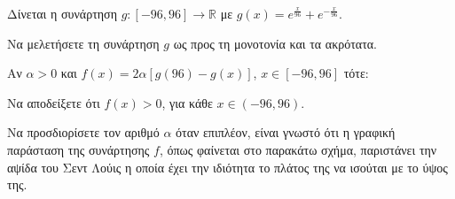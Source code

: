 Δίνεται η συνάρτηση $g:[-96,96]\to\mathbb{R}$ με $g(x)=e^{\frac{x}{96}}+e^{-\frac{x}{96}}$.
\begin{alist}
\item Να μελετήσετε τη συνάρτηση $g$ ως προς τη μονοτονία και τα ακρότατα. 
\item Αν $\alpha > 0$ και $f(x)=2\alpha\left[g(96)-g(x)\right]$, $x\in[-96,96]$ τότε:
    \begin{rlist}
    \item Να αποδείξετε ότι $f(x)>0$, για κάθε $x\in(-96,96)$. 
    \item Να προσδιορίσετε τον αριθμό $\alpha$ όταν επιπλέον, είναι γνωστό ότι η γραφική παράσταση της συνάρτησης $f$, όπως φαίνεται στο παρακάτω σχήμα, παριστάνει την αψίδα του Σεντ Λούις η οποία έχει την ιδιότητα το πλάτος της να ισούται με το ύψος της. 
    \end{rlist}
\end{alist}